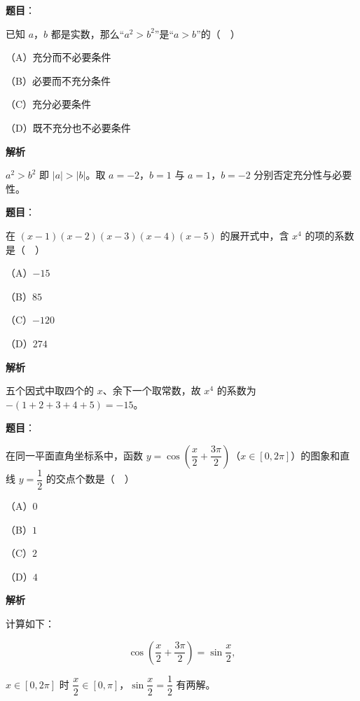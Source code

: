 \begin{answer}

\textbf{题目}：

已知 $a$，$b$ 都是实数，那么“$a^2>b^2$”是“$a>b$”的（　）

（A）充分而不必要条件

（B）必要而不充分条件

（C）充分必要条件

（D）既不充分也不必要条件

\textbf{解析}

$a^2>b^2$ 即 $|a|>|b|$。取 $a=-2$，$b=1$ 与 $a=1$，$b=-2$ 分别否定充分性与必要性。


\end{answer}
\begin{answer}

\textbf{题目}：

在 $(x-1)(x-2)(x-3)(x-4)(x-5)$ 的展开式中，含 $x^4$ 的项的系数是（　）

（A）$-15$

（B）$85$

（C）$-120$

（D）$274$

\textbf{解析}

五个因式中取四个的 $x$、余下一个取常数，故 $x^4$ 的系数为 $-(1+2+3+4+5)=-15$。


\end{answer}
\begin{answer}

\textbf{题目}：

在同一平面直角坐标系中，函数 $y=\cos\left(\dfrac x2+\dfrac{3\pi}2\right)$（$x\in[0,2\pi]$）的图象和直线 $y=\dfrac12$ 的交点个数是（　）

（A）$0$

（B）$1$

（C）$2$

（D）$4$

\textbf{解析}

计算如下：

\nopagebreak[4]
\[\cos\left(\frac x2+\frac{3\pi}2\right)=\sin\frac x2,\]

$x\in[0,2\pi]$ 时 $\dfrac x2\in[0,\pi]$，$\sin\dfrac x2=\dfrac12$ 有两解。


\end{answer}
